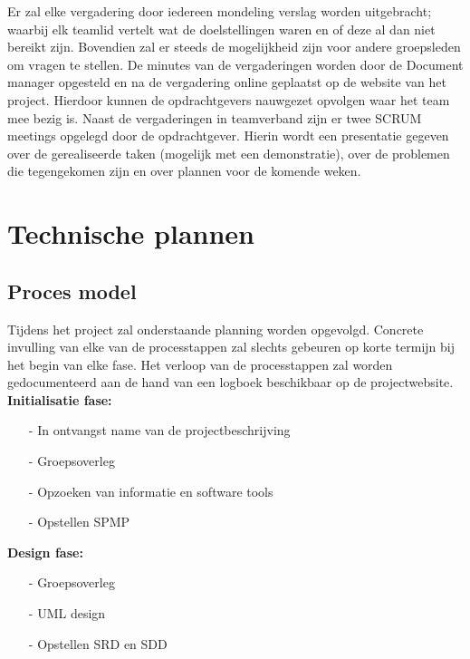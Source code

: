 \documentclass{article}
\begin{document}
Er zal elke vergadering door iedereen mondeling verslag worden uitgebracht; waarbij elk teamlid vertelt wat de doelstellingen waren en of deze al dan niet bereikt zijn. Bovendien zal er steeds de mogelijkheid zijn voor andere groepsleden om vragen te stellen. De minutes van de vergaderingen worden door de Document manager opgesteld en na de vergadering online geplaatst op de website van het project. Hierdoor kunnen de opdrachtgevers nauwgezet opvolgen waar het team mee bezig is.
Naast de vergaderingen in teamverband zijn er twee SCRUM meetings opgelegd door de opdrachtgever. Hierin wordt een presentatie gegeven over de gerealiseerde taken (mogelijk met een demonstratie), over de problemen die tegengekomen zijn en over plannen voor de komende weken.

\newpage
\section{Technische plannen}

\subsection{Proces model}


Tijdens het project zal onderstaande planning worden opgevolgd. Concrete invulling van elke van de processtappen zal slechts gebeuren op korte termijn bij het begin van elke fase. Het verloop van de processtappen zal worden gedocumenteerd aan de hand van een logboek beschikbaar op de
projectwebsite. \\[3mm]

\textbf{Initialisatie fase:}
\begin{itemize}
\item[-] In ontvangst name van de projectbeschrijving\\[-5mm]
\item[-] Groepsoverleg\\[-5mm]
\item[-] Opzoeken van informatie en software tools\\[-5mm]
\item[-] Opstellen SPMP\\[-5mm]
\end{itemize}


\textbf{Design fase:}
\begin{itemize}
\item[-]Groepsoverleg\\[-5mm]
\item[-]UML design\\[-5mm]
\item[-]Opstellen SRD en SDD\\[-5mm]
\end{itemize}
\end{document}
